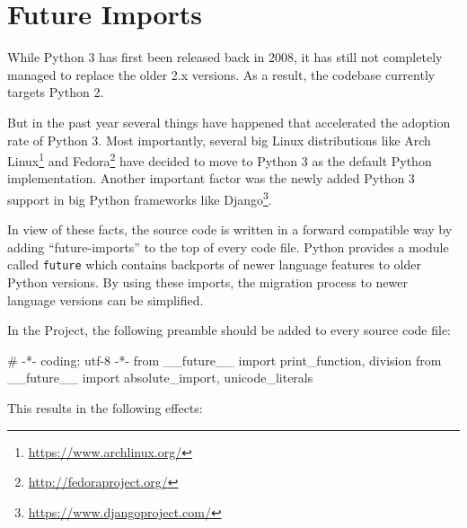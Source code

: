 
\section{Future Imports}

While Python 3 has first been released back in 2008, it has still not completely
managed to replace the older 2.x versions. As a result, the \tangible{} codebase
currently targets Python 2.

But in the past year several things have happened that accelerated the adoption
rate of Python 3. Most importantly, several big Linux distributions like Arch
Linux\footnote{\url{https://www.archlinux.org/}} and
Fedora\footnote{\url{http://fedoraproject.org/}} have decided to move to Python
3 as the default Python implementation. Another important factor was the newly
added Python 3 support in big Python frameworks like
Django\footnote{\url{https://www.djangoproject.com/}}.

In view of these facts, the \tangible{} source code is written in a forward
compatible way by adding ``future-imports'' to the top of every code file.
Python provides a module called \texttt{future} which contains backports of
newer language features to older Python versions. By using these imports, the
migration process to newer language versions can be simplified.

In the \tangible{} Project, the following preamble should be added to every
source code file:

\vspace{.5\baselineskip}
\begin{pythoncode}
# -*- coding: utf-8 -*-
from __future__ import print_function, division
from __future__ import absolute_import, unicode_literals
\end{pythoncode}

\noindent This results in the following effects:

